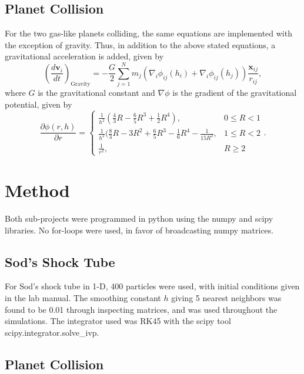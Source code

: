 \documentclass[12pt]{article}
\begin{document}
\subsection{Planet Collision}

For the two gas-like planets colliding, the same equations are implemented with the exception of gravity. Thus, in addition to the above stated equations, a gravitational acceleration is added, given by 
\begin{equation}
	\left(\frac{d\mathbf{v}_i}{dt}\right)_{\mathrm{Gravity}} = -\frac{G}{2}\sum_{j=1}^N m_j(\nabla_i\phi_{ij}(h_i) + \nabla_i\phi_{ij}(h_j))\frac{\mathbf{x}_{ij}}{r_{ij}},
\end{equation}
where $G$ is the gravitational constant and $\nabla\phi$ is the gradient of the gravitational potential, given by 
\begin{equation}
	\frac{\partial\phi(r,h)}{\partial r} = 
	\begin{cases}
		\frac{1}{h^2}(\frac{4}{3}R - \frac{6}{5}R^3 + \frac{1}{2}R^4), & 0 \leq R < 1\\
		\frac{1}{h^2}(\frac{8}{3}R - 3R^2 + \frac{6}{5}R^3 - \frac{1}{6}R^4 - \frac{1}{15R^2}, & 1\leq R < 2\\
		\frac{1}{r^2}, & R\geq2
	\end{cases}.
\end{equation}


\section{Method}

Both sub-projects were programmed in python using the numpy and scipy libraries. No for-loops were used, in favor of broadcasting numpy matrices. 

\subsection{Sod's Shock Tube}

For Sod's shock tube in 1-D, 400 particles were used, with initial conditions given in the lab manual\cite{Hobbs}. The smoothing constant $ h $ giving 5 nearest neighbors was found to be 0.01 through inspecting matrices, and was used throughout the simulations. The integrator used was RK45 with the scipy tool scipy.integrator.solve\_ivp.

\subsection{Planet Collision}
\end{document}
